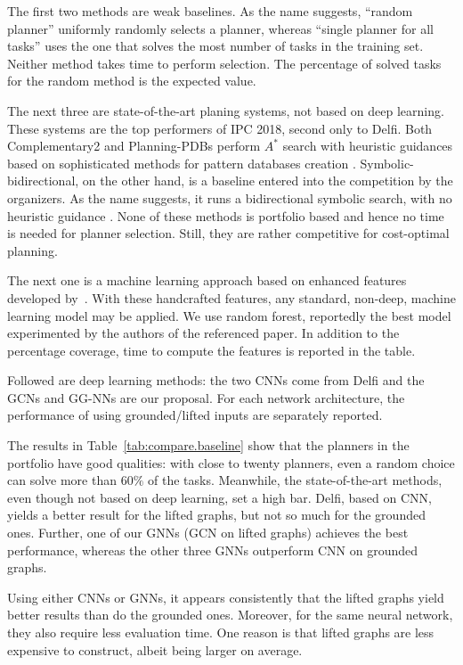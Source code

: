 \documentclass[letterpaper]{article} %
\begin{document}
The first two methods are weak baselines. As the name suggests, ``random planner'' uniformly randomly selects a planner, whereas ``single planner for all tasks'' uses the one that solves the most number of tasks in the training set. Neither method takes time to perform selection. The percentage of solved tasks for the random method is the expected value.

The next three are state-of-the-art planing systems, not based on deep
learning. These systems are the top performers of IPC 2018, second
only to Delfi. Both Complementary2 and Planning-PDBs perform
$A^{\ast}$ search with heuristic guidances based on sophisticated
methods for pattern databases
creation \cite{franco-et-al-ipc2018b,moises-et-al-ipc2018}.
Symbolic-bidirectional, on the other hand, is a baseline entered into
the competition by the organizers. As the name suggests, it runs a
bidirectional symbolic search, with no heuristic
guidance \cite{torralba-et-al-aij2017}.  None of these methods is
portfolio based and hence no time is needed for planner
selection. Still, they are rather competitive for cost-optimal
planning.

The next one is a machine learning approach based on enhanced features
developed by~\cite{Fawcett2014}. With these handcrafted features, any
standard, non-deep, machine learning model may be applied. We use
random forest, reportedly the best model experimented by the authors
of the referenced paper. In addition to the percentage coverage, time
to compute the features is reported in the table.

Followed are deep learning methods: the two CNNs come from Delfi and the GCNs and GG-NNs are our proposal. For each network architecture, the performance of using grounded/lifted inputs are separately reported.

The results in Table~\ref{tab:compare.baseline} show that the planners in the portfolio have good qualities: with close to twenty planners, even a random choice can solve more than $60\%$ of the tasks. Meanwhile, the state-of-the-art methods, even though not based on deep learning, set a high bar. Delfi, based on CNN, yields a better result for the lifted graphs, but not so much for the grounded ones. Further, one of our GNNs (GCN on lifted graphs) achieves the best performance, whereas the other three GNNs outperform CNN on grounded graphs.

Using either CNNs or GNNs, it appears consistently that the lifted graphs yield better results than do the grounded ones. Moreover, for the same neural network, they also require less evaluation time. One reason is that lifted graphs are less expensive to construct, albeit being larger on average.
\end{document}
